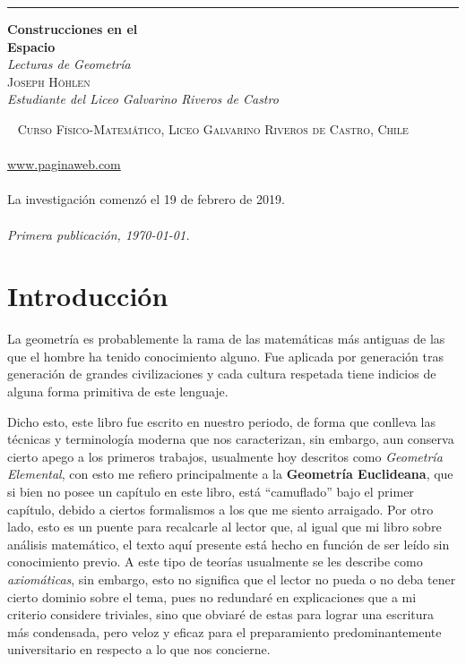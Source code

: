 \documentclass[11pt,a4paper]{book}
\begin{document}


\frontmatter
\begin{titlepage}
	\raggedleft
	\rule{1pt}{\textheight}
	\hspace{0.05\textwidth}
	\parbox[b]{0.75\textwidth}{
		{\Huge\bfseries Construcciones en el\\[0.5\baselineskip]Espacio}\\[2\baselineskip] %
		{\large\textit{Lecturas de Geometría}}\\[4\baselineskip] %
		{\Large\textsc{Joseph Höhlen}\\[0.5\baselineskip] \textit{Estudiante del Liceo Galvarino Riveros de Castro}} %
		\vspace{0.5\textheight}
	}
\end{titlepage}

\newpage
~\vfill
\thispagestyle{empty}
\noindent \textsc{Curso Físico-Matemático, Liceo Galvarino Riveros de Castro, Chile}\\\\
\url{www.paginaweb.com}\\\\
La investigación comenzó el 19 de febrero de 2019.\\\\
\textit{Primera publicación, \today{}.} 

\tableofcontents

\chapter{Introducción}
La geometría es probablemente la rama de las matemáticas más antiguas de las que el hombre ha tenido conocimiento alguno. Fue aplicada por generación tras generación de grandes civilizaciones y cada cultura respetada tiene indicios de alguna forma primitiva de este lenguaje.

Dicho esto, este libro fue escrito en nuestro periodo, de forma que conlleva las técnicas y terminología moderna que nos caracterizan, sin embargo, aun conserva cierto apego a los primeros trabajos, usualmente hoy descritos como \textit{Geometría Elemental}, con esto me refiero principalmente a la \textbf{Geometría Euclideana}, que si bien no posee un capítulo en este libro, está ``camuflado'' bajo el primer capítulo, debido a ciertos formalismos a los que me siento arraigado. Por otro lado, esto es un puente para recalcarle al lector que, al igual que mi libro sobre análisis matemático, el texto aquí presente está hecho en función de ser leído sin conocimiento previo. A este tipo de teorías usualmente se les describe como \textit{axiomáticas}, sin embargo, esto no significa que el lector no pueda o no deba tener cierto dominio sobre el tema, pues no redundaré en explicaciones que a mi criterio considere triviales, sino que obviaré de estas para lograr una escritura más condensada, pero veloz y eficaz para el preparamiento predominantemente universitario en respecto a lo que nos concierne.
\end{document}
